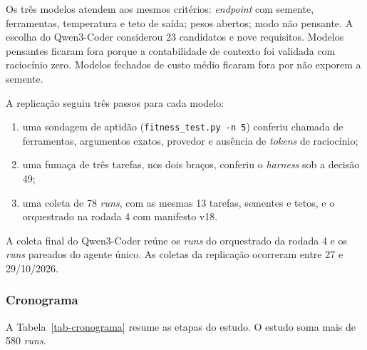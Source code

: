 Os três modelos atendem aos mesmos critérios: \textit{endpoint} com semente, ferramentas, temperatura e teto de saída; pesos abertos; modo não pensante. A escolha do Qwen3-Coder considerou 23 candidatos e nove requisitos. Modelos pensantes ficaram fora porque a contabilidade de contexto foi validada com raciocínio zero. Modelos fechados de custo médio ficaram fora por não exporem a semente.

A replicação seguiu três passos para cada modelo:

\begin{enumerate}
    \item uma sondagem de aptidão (\texttt{fitness\_test.py -n 5}) conferiu chamada de ferramentas, argumentos exatos, provedor e ausência de \textit{tokens} de raciocínio;
    \item uma fumaça de três tarefas, nos dois braços, conferiu o \textit{harness} sob a decisão 49;
    \item uma coleta de 78 \textit{runs}, com as mesmas 13 tarefas, sementes e tetos, e o orquestrado na rodada 4 com manifesto v18.
\end{enumerate}

A coleta final do Qwen3-Coder reúne os \textit{runs} do orquestrado da rodada 4 e os \textit{runs} pareados do agente único. As coletas da replicação ocorreram entre 27 e 29/10/2026.

\subsubsection{Cronograma}

A Tabela~\ref{tab-cronograma} resume as etapas do estudo. O estudo soma mais de 580 \textit{runs}.

